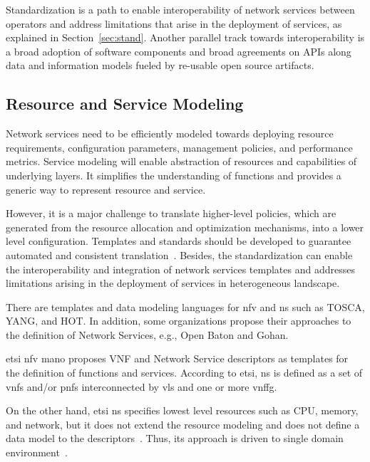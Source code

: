 Standardization is a path to enable interoperability of network services between operators and address limitations that arise in the deployment of services, as explained in Section~\ref{sec:stand}. Another parallel track towards interoperability is a broad adoption of software components and broad agreements on APIs along data and information models fueled by re-usable open source artifacts. 

\subsection{Resource and Service Modeling}

Network services need to be efficiently modeled towards deploying resource requirements, configuration parameters, management policies, and performance metrics. Service modeling will enable abstraction of resources and capabilities of underlying layers. It simplifies the understanding of functions and provides a generic way to represent resource and service. 

However, it is a major challenge to translate higher-level policies, which are generated from the resource allocation and optimization mechanisms, into a lower level configuration. Templates and standards should be developed to guarantee automated and consistent translation~\cite{YongLi2015Software-DefinedSurvey}. Besides, the standardization can enable the interoperability and integration of network services templates and addresses limitations arising in the deployment of services in heterogeneous landscape.

There are templates and data modeling languages for \acrfull{nfv} and \acrfull{ns} such as TOSCA, YANG, and HOT. In addition, some organizations propose their approaches to the definition of Network Services, e.g., Open Baton and Gohan.

\gls{etsi} \gls{nfv} \gls{mano} proposes VNF and Network Service descriptors as templates for the definition of functions and services. According to \gls{etsi}, \gls{ns} is defined as a set of \glspl{vnf} and/or \glspl{pnf} interconnected by \glspl{vl} and one or more \acrlong{vnffg}. 

On the other hand, \gls{etsi} \gls{ns} specifies lowest level resources such as CPU, memory, and network, but it does not extend the resource modeling and does not define a data model to the descriptors~\cite{Mijumbi2016ManagementVirtualizationb}. Thus, its approach is driven to single domain environment~\cite{Garay2016ServiceForward}. 

